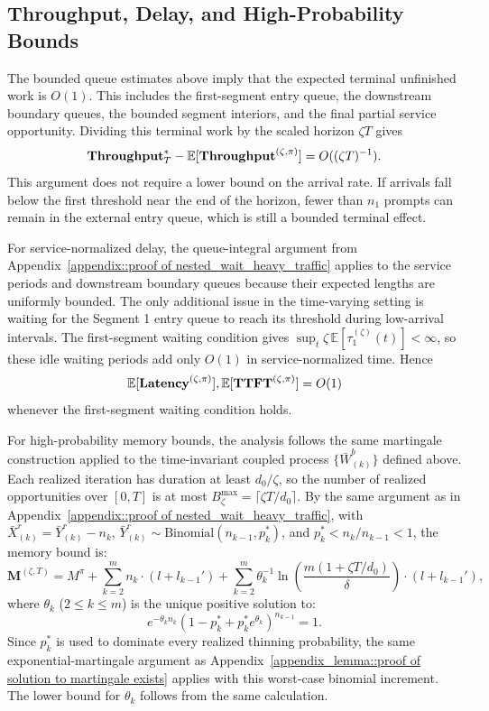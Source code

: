\subsection{Throughput, Delay, and High-Probability Bounds}

The bounded queue estimates above imply that the expected terminal unfinished work is \(O(1)\). This includes the first-segment entry queue, the downstream boundary queues, the bounded segment interiors, and the final partial service opportunity. Dividing this terminal work by the scaled horizon \(\zeta T\) gives
\[
    \textbf{Throughput}_T^*-\mathbb{E}[\textbf{Throughput}^{(\zeta,\pi)}]
    =
    O((\zeta T)^{-1}).
\]
This argument does not require a lower bound on the arrival rate. If arrivals fall below the first threshold near the end of the horizon, fewer than \(n_1\) prompts can remain in the external entry queue, which is still a bounded terminal effect.

For service-normalized delay, the queue-integral argument from Appendix~\ref{appendix::proof of nested_wait_heavy_traffic} applies to the service periods and downstream boundary queues because their expected lengths are uniformly bounded. The only additional issue in the time-varying setting is waiting for the Segment 1 entry queue to reach its threshold during low-arrival intervals. The first-segment waiting condition gives \(\sup_t\zeta\,\mathbb E[\tau_1^{(\zeta)}(t)]<\infty\), so these idle waiting periods add only \(O(1)\) in service-normalized time. Hence
\[
    \mathbb{E}[\textbf{Latency}^{(\zeta,\pi)}],
    \mathbb{E}[\textbf{TTFT}^{(\zeta,\pi)}]
    =
    O(1)
\]
whenever the first-segment waiting condition holds.

For high-probability memory bounds, the analysis follows the same martingale construction applied to the time-invariant coupled process $\{ \bar{W}_{(k)}^b \}$ defined above. Each realized iteration has duration at least \(d_0/\zeta\), so the number of realized opportunities over \([0,T]\) is at most \(B_\zeta^{\max}=\lceil \zeta T/d_0\rceil\). By the same argument as in Appendix~\ref{appendix::proof of nested_wait_heavy_traffic}, with $\bar{X}_{(k)}^{r} = \bar{Y}_{(k)}^r - n_k$, $\bar{Y}_{(k)}^r \sim \text{Binomial}(n_{k-1}, p_k^*)$, and $p_k^*<n_k/n_{k-1}<1$, the memory bound is:
$$\mathbf{M}^{(\zeta,T)} = M^{\pi} + \sum_{k=2}^m n_k \cdot (l + l_{k-1}') + \sum_{k=2}^m \theta_k^{-1}\ln\left( \frac{m(1+\zeta T/d_0)}{\delta} \right) \cdot (l + l_{k-1}'),$$
where $\theta_k$ ($2\leq k\leq m$) is the unique positive solution to:
\begin{equation}
e^{-\theta_k n_k} (1 - p_k^* + p_k^* e^{\theta_k})^{n_{k-1}} = 1.\label{eq::eq of theta, time varying}
\end{equation}
Since \(p_k^*\) is used to dominate every realized thinning probability, the same exponential-martingale argument as Appendix~\ref{appendix_lemma::proof of solution to martingale exists} applies with this worst-case binomial increment. The lower bound for \(\theta_k\) follows from the same calculation.
